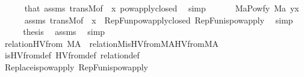 \begin{isabellebody}
\ \ \ \ \isamarkupfalse%
\ that\ assms\ transM{\isacharbrackleft}{\kern0pt}of\ {\isacharunderscore}{\kern0pt}\ x{\isacharbrackright}{\kern0pt}\ powapply{\isacharunderscore}{\kern0pt}closed\ \isamarkupfalse%
\ simp\isanewline
\ \ \isamarkupfalse%
\isanewline
\ \ \isamarkupfalse%
\ {\isachardoublequoteopen}M{\isacharparenleft}{\kern0pt}{\isacharbraceleft}{\kern0pt}{\isacharbraceleft}{\kern0pt}a{\isasymin}Pow{\isacharparenleft}{\kern0pt}f{\isacharbackquote}{\kern0pt}y{\isacharparenright}{\kern0pt}{\isachardot}{\kern0pt}\ M{\isacharparenleft}{\kern0pt}a{\isacharparenright}{\kern0pt}{\isacharbraceright}{\kern0pt}{\isachardot}{\kern0pt}\ y{\isasymin}x{\isacharbraceright}{\kern0pt}{\isacharparenright}{\kern0pt}{\isachardoublequoteclose}\isanewline
\ \ \ \ \isamarkupfalse%
\ assms\ transM{\isacharbrackleft}{\kern0pt}of\ {\isacharunderscore}{\kern0pt}\ x{\isacharbrackright}{\kern0pt}\ \ RepFun{\isacharunderscore}{\kern0pt}powapply{\isacharunderscore}{\kern0pt}closed\ RepFun{\isacharunderscore}{\kern0pt}is{\isacharunderscore}{\kern0pt}powapply\ \isamarkupfalse%
\ simp\isanewline
\ \ \isamarkupfalse%
\ \isamarkupfalse%
\ {\isacharquery}{\kern0pt}thesis\ \isamarkupfalse%
\ assms\ \isamarkupfalse%
\ simp\isanewline
{}\isamarkupfalse%
%
\endisatagproof
{\isafoldproof}%
%
\isadelimproof
\isanewline
%
\endisadelimproof
\isanewline
{}\isamarkupfalse%
\ relation{}{\isacharunderscore}{\kern0pt}HVfrom{\isacharcolon}{\kern0pt}\ {\isachardoublequoteopen}M{\isacharparenleft}{\kern0pt}A{\isacharparenright}{\kern0pt}\ {\isasymLongrightarrow}\ relation{}{\isacharparenleft}{\kern0pt}M{\isacharcomma}{\kern0pt}is{\isacharunderscore}{\kern0pt}HVfrom{\isacharparenleft}{\kern0pt}M{\isacharcomma}{\kern0pt}A{\isacharparenright}{\kern0pt}{\isacharcomma}{\kern0pt}HVfrom{\isacharparenleft}{\kern0pt}M{\isacharcomma}{\kern0pt}A{\isacharparenright}{\kern0pt}{\isacharparenright}{\kern0pt}{\isachardoublequoteclose}\isanewline
%
\isadelimproof
\ \ \ \ %
\endisadelimproof
%
\isatagproof
{}\isamarkupfalse%
\ is{\isacharunderscore}{\kern0pt}HVfrom{\isacharunderscore}{\kern0pt}def\ HVfrom{\isacharunderscore}{\kern0pt}def\ relation{}{\isacharunderscore}{\kern0pt}def\isanewline
\ \ \ \ \isamarkupfalse%
\ Replace{\isacharunderscore}{\kern0pt}is{\isacharunderscore}{\kern0pt}powapply\ RepFun{\isacharunderscore}{\kern0pt}is{\isacharunderscore}{\kern0pt}powapply\ \isanewline

\end{isabellebody}
